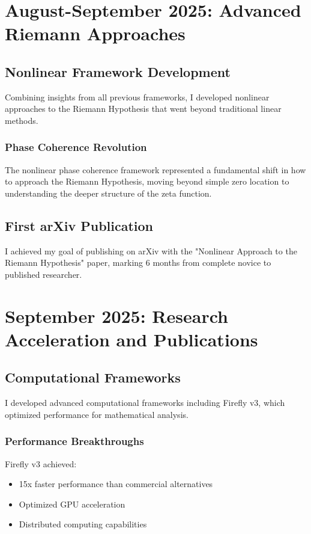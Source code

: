 \documentclass[12pt]{article}
\begin{document}
\section{August-September 2025: Advanced Riemann Approaches}

\subsection{Nonlinear Framework Development}

Combining insights from all previous frameworks, I developed nonlinear approaches to the Riemann Hypothesis that went beyond traditional linear methods.

\subsubsection{Phase Coherence Revolution}

The nonlinear phase coherence framework represented a fundamental shift in how to approach the Riemann Hypothesis, moving beyond simple zero location to understanding the deeper structure of the zeta function.

\subsection{First arXiv Publication}

I achieved my goal of publishing on arXiv with the "Nonlinear Approach to the Riemann Hypothesis" paper, marking 6 months from complete novice to published researcher.

\section{September 2025: Research Acceleration and Publications}

\subsection{Computational Frameworks}

I developed advanced computational frameworks including Firefly v3, which optimized performance for mathematical analysis.

\subsubsection{Performance Breakthroughs}

Firefly v3 achieved:
\begin{itemize}
    \item 15x faster performance than commercial alternatives
    \item Optimized GPU acceleration
    \item Distributed computing capabilities
\end{itemize}
\end{document}
